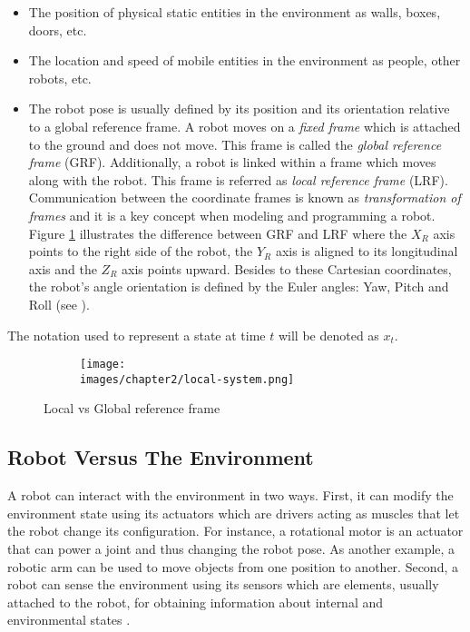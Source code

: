 \begin{itemize}
\item The position of physical static entities in the environment as walls, boxes, doors, etc.
\item The location and speed of mobile entities in the environment as people, other robots, etc.
\item The robot pose is usually defined by its position and its orientation relative to a global reference frame. A robot moves on a \textit{fixed frame} which is attached to the ground and does not move. This frame is called the \textit{global reference frame} (GRF). Additionally, a robot is linked within a frame which moves along with the robot. This frame is referred as \textit{local reference frame} (LRF). Communication between the coordinate frames is known as \textit{transformation of frames} and it is a key concept when modeling and programming a robot\cite{Reza:Theory-of-applied-robotics}. Figure \ref{fig:ch-2-global-local} illustrates the difference between GRF and LRF where the $X_R$ axis points to the right side of the robot, the $Y_R$ axis is aligned to its longitudinal axis and the $Z_R$ axis points upward. Besides to these Cartesian coordinates, the robot's angle orientation is defined by the Euler angles: Yaw, Pitch and Roll (see \cite{Cook:mobile-robots}). 
\end{itemize}

The notation used to represent a state at time $t$ will be denoted as $x_t$.

\begin{figure}[h!]
  \centering
  \begin{subfigure}[b]{0.5\linewidth}
  	\texttt{[image: \\images/chapter2/local-system.png]}
  \end{subfigure}
  \caption{Local vs Global reference frame}
  \label{fig:ch-2-global-local}
\end{figure}

\subsection{Robot Versus The Environment}

A robot can interact with the environment in two ways. First, it can modify the environment state using its actuators which are drivers acting as muscles that let the robot change its configuration\cite{Reza:Theory-of-applied-robotics}. For instance, a rotational motor is an actuator that can power a joint and thus changing the robot pose. As another example, a robotic arm can be used to move objects from one position to another. Second, a robot can sense the environment using its sensors which are elements, usually attached to the robot, for obtaining information about internal and environmental states \cite{Reza:Theory-of-applied-robotics}\cite{Thrun:2005:PR:1121596}. 

